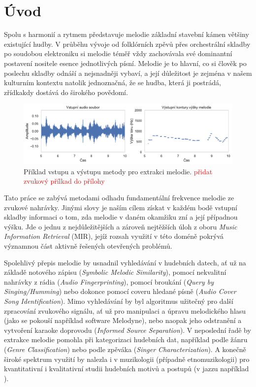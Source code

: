 \chapter{Úvod}\label{cha:uvod}

Spolu s harmonií a rytmem představuje melodie základní stavební kámen většiny existující hudby. V průběhu vývoje od folklórních zpěvů přes orchestrální skladby po soudobou elektroniku si melodie téměř vždy zachovávala své dominantní postavení nositele esence jednotlivých písní. Melodie je to hlavní, co si člověk po poslechu skladby odnáší a nejsnadněji vybaví, a její důležitost je zejména v našem kulturním kontextu natolik jednoznačná, že se hudba, která ji postrádá, zřídkakdy dostává do širokého povědomí.

\begin{figure}[h]\centering
\includegraphics[width=\textwidth,height=\textheight,keepaspectratio]{../img/input_output}
\caption{Příklad vstupu a výstupu metody pro extrakci melodie. \textcolor{red}{přidat zvukový přílkad do přílohy}}
\label{obr:input_output}
\end{figure}

Tato práce se zabývá metodami odhadu fundamentální frekvence melodie ze zvukové nahrávky. Jinými slovy je naším cílem získat v každém bodě vstupní skladby informaci o tom, zda melodie v daném okamžiku zní a její případnou výšku. Jde o jednu z nejdůležitějších a zároveň nejtěžších úloh z oboru \textit{Music Information Retrieval} (MIR), jejíž rozsah využití v této doméně pokrývá významnou část aktivně řešených otevřených problémů. 

Spolehlivý přepis melodie by usnadnil vyhledávání v hudebních datech, ať už na základě notového zápisu (\textit{Symbolic Melodic Similarity}), pomocí nekvalitní nahrávky z rádia (\textit{Audio Fingerprinting}), pomocí broukání (\textit{Query by Singing/Humming}) nebo dokonce pomocí coveru hledané písně (\textit{Audio Cover Song Identification}). Mimo vyhledávání by byl algoritmus užitečný pro další zpracování zvukového signálu, ať už pro manipulaci a úpravu melodického hlasu (jako se pokouší například software Melodyne), nebo naopak jeho odstranění a vytvoření karaoke doprovodu (\textit{Informed Source Separation}). V neposlední řadě by extrakce melodie pomohla při kategorizaci hudebních dat, například podle žánru (\textit{Genre Classification}) nebo podle zpěváka (\textit{Singer Characterization}). A konečně široké spektrum využití by nalezla i v muzikologii (případně etnomuzikologii) pro kvantitativní i kvalitativní studii hudebních motivů a postupů (v jazzu například \cite{Pfleiderer}).


